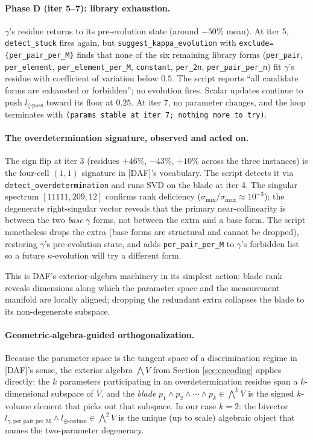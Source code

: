 \paragraph{Phase D (iter 5--7): library exhaustion.}
$\gamma$'s residue returns to its pre-evolution
state (around $-50\%$ mean). At iter 5,
\verb|detect_stuck| fires again, but
\verb|suggest_kappa_evolution| with
\verb|exclude={per_pair_per_M}| finds that none of
the six remaining library forms
(\verb|per_pair|, \verb|per_element|,
\verb|per_element_per_M|, \verb|constant|,
\verb|per_2n|, \verb|per_pair_per_n|) fit
$\gamma$'s residue with coefficient of variation
below $0.5$. The script reports ``all candidate
forms are exhausted or forbidden''; no evolution
fires. Scalar updates continue to push
$l_{\zeta\text{-pass}}$ toward its floor at $0.25$.
At iter 7, no parameter changes, and the loop
terminates with \texttt{(params stable at iter 7;
nothing more to try)}.

\paragraph{The overdetermination signature, observed
and acted on.} The sign flip at iter 3 (residues
$+46\%$, $-43\%$, $+10\%$ across the three instances) is
the four-cell $(1,1)$ signature in [DAF]'s vocabulary.
The script detects it via
\verb|detect_overdetermination| and runs SVD on the
blade at iter 4. The singular spectrum
$[11111, 209, 12]$ confirms rank deficiency
($\sigma_{\min}/\sigma_{\max} \approx 10^{-3}$); the
degenerate right-singular vector reveals that the
primary near-collinearity is between the two
\emph{base} $\gamma$ forms, not between the extra and
a base form. The script nonetheless drops the
extra (base forms are structural and cannot be
dropped), restoring $\gamma$'s pre-evolution state,
and adds \verb|per_pair_per_M| to $\gamma$'s
forbidden list so a future $\kappa$-evolution will
try a different form.

This is DAF's exterior-algebra machinery in its
simplest action: blade rank reveals dimensions along
which the parameter space and the measurement manifold
are locally aligned; dropping the redundant extra
collapses the blade to its non-degenerate subspace.

\paragraph{Geometric-algebra-guided orthogonalization.}
Because the parameter space is the tangent space of a
discrimination regime in [DAF]'s sense, the exterior
algebra $\bigwedge V$ from Section \ref{sec:encoding}
applies directly: the $k$ parameters participating in
an overdetermination residue span a $k$-dimensional
subspace of $V$, and the \emph{blade} $p_1 \wedge p_2
\wedge \cdots \wedge p_k \in \bigwedge^k V$ is the
signed $k$-volume element that picks out that subspace.
In our case $k = 2$: the bivector
$l_{\gamma,\mathrm{per\_pair\_per\_M}} \wedge
l_{\oplus\text{-reduce}} \in \bigwedge^2 V$ is the
unique (up to scale) algebraic object that names the
two-parameter degeneracy.


